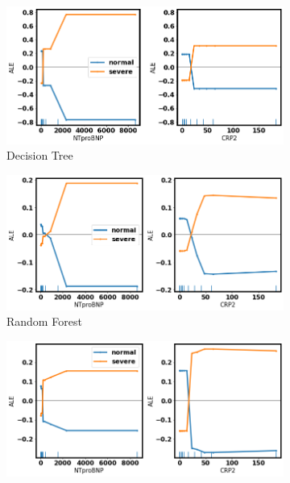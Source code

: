 \begin{figure}
\centering
\begin{subfigure}[b]{0.485\textwidth}
    \centering
    \includegraphics[width=\textwidth]{figures/chapter_interp/dt_ALE_NTproBNP_CRP.png}
    \caption{Decision Tree}
    \label{fig:dt_ale}
\end{subfigure}
\hfill
\begin{subfigure}[b]{0.485\textwidth}
    \centering
    \includegraphics[width=\textwidth]{figures/chapter_interp/rf_ALE_NTproBNP_CRP.png}
    \caption{Random Forest}
    \label{fig:rf_ale}
\end{subfigure}
\hfill
\begin{subfigure}[b]{0.485\textwidth}
    \centering
    \includegraphics[width=\textwidth]{figures/chapter_interp/xgbc_ALE_NTproBNP_CRP.png}

\end{subfigure}
\end{figure}
